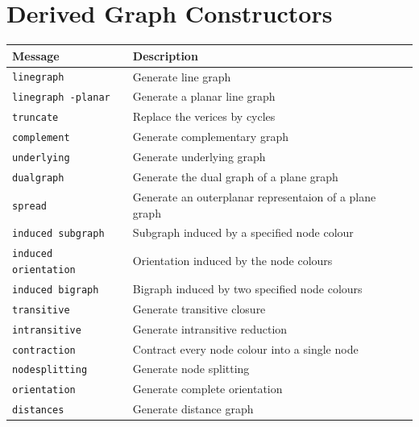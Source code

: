 \documentclass[a4paper,11pt,twoside]{book}
\begin{document}
\section{Derived Graph Constructors}
\medskip
\begin{center}
\begin{tabular}{|p{5.3cm}|p{10cm}|}
\hline
{\bf Message}        & {\bf Description} \\
\hline
\hline
\verb/linegraph/     & Generate line graph \\
\hline
\verb/linegraph -planar/ & Generate a planar line graph \\
\hline
\verb/truncate/      & Replace the verices by cycles \\
\hline
\verb/complement/    & Generate complementary graph \\
\hline
\verb/underlying/    & Generate underlying graph \\
\hline
\verb/dualgraph/     & Generate the dual graph of a plane graph \\
\hline
\verb/spread/        & Generate an outerplanar representaion of a plane graph \\
\hline
\verb/induced subgraph/ & Subgraph induced by a specified node colour \\
\hline
\verb/induced orientation/ & Orientation induced by the node colours \\
\hline
\verb/induced bigraph/  & Bigraph induced by two specified node colours \\
\hline
\verb/transitive/    & Generate transitive closure \\
\hline
\verb/intransitive/  & Generate intransitive reduction \\
\hline
\verb/contraction/   & Contract every node colour into a single node \\
\hline
\verb/nodesplitting/ & Generate node splitting \\
\hline
\verb/orientation/   & Generate complete orientation \\
\hline
\verb/distances/     & Generate distance graph \\
\hline
\end{tabular}
\end{center}


\end{document}

